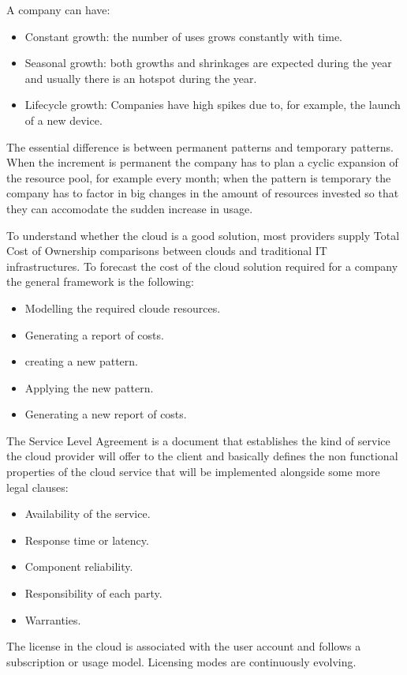 A company can have:
\begin{itemize}
    \item Constant growth: the number of uses grows constantly with time.
    \item Seasonal growth: both growths and shrinkages are expected during the year and usually there is an hotspot during the year.
    \item Lifecycle growth: Companies have high spikes due to, for example, the launch of a new device.
\end{itemize}
The essential difference is between permanent patterns and temporary patterns. When the increment is permanent the company has to plan a cyclic expansion of the resource pool, for example every month; when the pattern is temporary the company has to factor in big changes in the amount of resources invested so that they can accomodate the sudden increase in usage.

To understand whether the cloud is a good solution, most providers supply Total Cost of Ownership
comparisons between clouds and traditional IT infrastructures. To forecast the cost of the cloud
solution required for a company the general framework is the following:
\begin{itemize}
    \item Modelling the required cloude resources.
    \item Generating a report of costs.
    \item creating a new pattern.
    \item Applying the new pattern.
    \item Generating a new report of costs.
\end{itemize}
The Service Level Agreement is a document that establishes the kind of service the cloud provider
will offer to the client and basically defines the non functional properties of the cloud service
that will be implemented alongside some more legal clauses:
\begin{itemize}
    \item Availability of the service.
    \item Response time or latency.
    \item Component reliability.
    \item Responsibility of each party.
    \item Warranties.
\end{itemize}
The license in the cloud is associated with the user account and follows a subscription or usage model. Licensing modes are continuously evolving.
